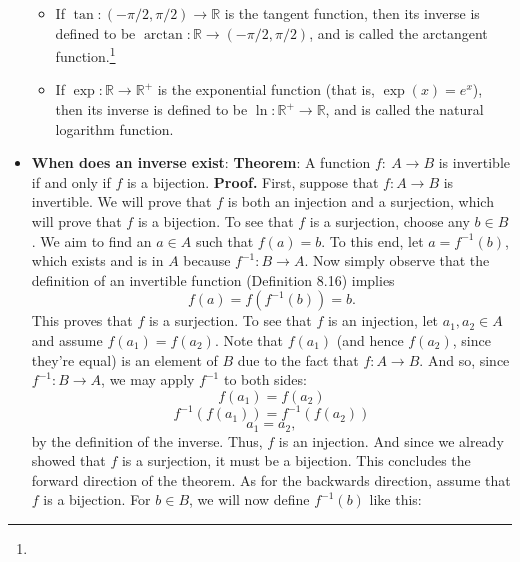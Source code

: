 \documentclass{report}
\begin{document}
\begin{itemize}
            \begin{itemize}
                \item If \( \tan : (-\pi/2, \pi/2) \to \mathbb{R} \) is the tangent function, then its inverse is defined to be \( \arctan : \mathbb{R} \to (-\pi/2, \pi/2) \), and is called the arctangent function.\footnote{}
                \item If \( \exp : \mathbb{R} \to \mathbb{R}^+ \) is the exponential function (that is, \( \exp(x) = e^x \)), then its inverse is defined to be \( \ln : \mathbb{R}^+ \to \mathbb{R} \), and is called the natural logarithm function.
            \end{itemize}
        \item \textbf{When does an inverse exist}:
            \bigbreak \noindent 
            \textbf{Theorem}: A function $f:\ A \to B$ is invertible if and only if $f$ is a bijection.
            \bigbreak \noindent 
            \textbf{Proof.} First, suppose that \( f : A \to B \) is invertible. We will prove that \( f \) is both
            an injection and a surjection, which will prove that \( f \) is a bijection. To see that \( f \)
            is a surjection, choose any \( b \in B \). We aim to find an \( a \in A \) such that \( f(a) = b \). To 
            this end, let \( a = f^{-1}(b) \), which exists and is in \( A \) because \( f^{-1} : B \to A \). Now simply
            observe that the definition of an invertible function (Definition 8.16) implies
            \[
                f(a) = f(f^{-1}(b)) = b.
            \]
            This proves that \( f \) is a surjection.
            \bigbreak \noindent 
            To see that \( f \) is an injection, let \( a_1, a_2 \in A \) and assume \( f(a_1) = f(a_2) \). Note that 
            \( f(a_1) \) (and hence \( f(a_2) \), since they're equal) is an element of \( B \) due to the fact that 
            \( f : A \to B \). And so, since \( f^{-1} : B \to A \), we may apply \( f^{-1} \) to both sides:
            \[
                f(a_1) = f(a_2)
            \]
            \[
                f^{-1}(f(a_1)) = f^{-1}(f(a_2))
            \]
            \[
                a_1 = a_2,
            \]
            by the definition of the inverse. Thus, \( f \) is an injection. And since we already showed 
            that \( f \) is a surjection, it must be a bijection. This concludes the forward direction of 
            the theorem.
            \bigbreak \noindent 
            As for the backwards direction, assume that \( f \) is a bijection. For \( b \in B \), we will 
            now define \( f^{-1}(b) \) like this:

\end{itemize}
\end{document}
